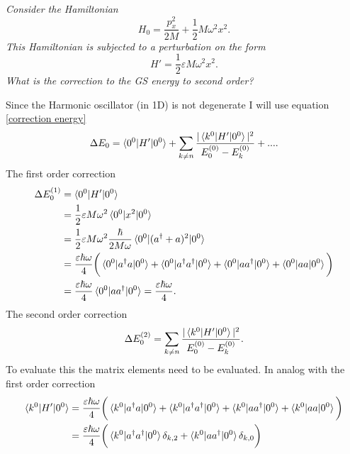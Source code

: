\begin{example}
	\emph{Consider the Hamiltonian}
	\begin{equation}
		H_0=\frac{p_x^2}{2M}+\frac{1}{2}M\omega^2x^2.
	\end{equation} 
	\emph{This Hamiltonian is subjected to a perturbation on the form}
	\begin{equation}
		H'=\frac{1}{2}\varepsilon M\omega^2 x^2.
	\end{equation} 
	\emph{What is the correction to the GS energy to second order?}\newline
	
	Since the Harmonic oscillator (in 1D) is not degenerate I will use equation \eqref{correction energy}
	\begin{equation}
		\Delta E_0=\braket{0^0|H'|0^0}+\sum_{k\neq n}\frac{|\braket{k^0|H'|0^0}|^2}{E_0^{(0)}-E_k^{(0)}}+....
	\end{equation} 
	The first order correction
	\begin{equation}
		\begin{split}
			\Delta E_0^{(1)}&=\braket{0^0|H'|0^0}\\
			&=\frac{1}{2}\varepsilon M\omega^2\braket{0^0|x^2|0^0}\\
			&=\frac{1}{2}\varepsilon M\omega^2\frac{\hbar}{2M\omega}\braket{0^0|(a^\dagger+a)^2|0^0}\\
			&=\frac{\varepsilon\hbar\omega}{4}\bigg(\braket{0^0|a^\dagger a|0^0}+\braket{0^0|a^\dagger a^\dagger|0^0}+\braket{0^0|aa^\dagger|0^0}+\braket{0^0|aa|0^0}\bigg)\\
			&=\frac{\varepsilon\hbar\omega}{4}\braket{0^0|aa^\dagger|0^0}=\frac{\varepsilon\hbar\omega}{4}.
		\end{split}
	\end{equation} 
	The second order correction
	\begin{equation}
		\Delta E_0^{(2)}=\sum_{k\neq n}\frac{|\braket{k^0|H'|0^0}|^2}{E_0^{(0)}-E_k^{(0)}}.
	\end{equation} 
	To evaluate this the matrix elements need to be evaluated. In analog with the first order correction
	\begin{equation}
		\begin{split}
			\braket{k^0|H'|0^0}&=\frac{\varepsilon\hbar\omega}{4}\bigg(\braket{k^0|a^\dagger a|0^0}+\braket{k^0|a^\dagger a^\dagger|0^0}+\braket{k^0|aa^\dagger|0^0}+\braket{k^0|aa|0^0}\bigg)\\
			&=\frac{\varepsilon\hbar\omega}{4}\bigg(\braket{k^0|a^\dagger a^\dagger|0^0}\delta_{k,2}+\braket{k^0|aa^\dagger|0^0}\delta_{k,0}\bigg)\\

\end{split}
\end{equation}
\end{example}
